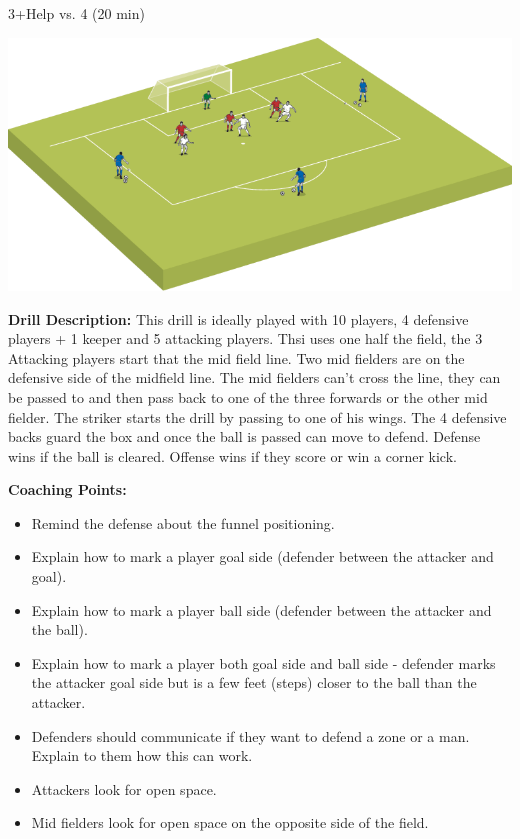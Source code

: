 \begin{evenBlock}{3+Help vs. 4 (20 min)}

\begin{minipage}[t]{\linewidth}
    \centering
    
    \begin{minipage}{.3\linewidth} %
        \includegraphics[width=\textwidth]{../img/Trimmed/SecureTheBox1}
    \end{minipage}
    \hspace{0.05\linewidth}
    \begin{minipage}{.6\linewidth} %
        \textbf{Drill Description:}
        This drill is ideally played with 10 players, 4 defensive players + 1 keeper and 5 attacking players.  Thsi uses one half the field, the 3 Attacking players start that the mid field line.  Two mid fielders are on the defensive side of the midfield line.  The mid fielders can't cross the line, they can be passed to and then pass back to one of the three forwards or the other mid fielder.  The striker starts the drill by passing to one of his wings.  The 4 defensive backs guard the box and once the ball is passed can move to defend.  Defense wins if the ball is cleared.  Offense wins if they score or win a corner kick.
        
        \textbf{Coaching Points:}
        \begin{itemize}
            \setlength{\itemsep}{0pt}
            \setlength{\parskip}{0pt}
            \setlength{\parsep}{0pt}
            \item Remind the defense about the funnel positioning.
            \item Explain how to mark a player goal side (defender between the attacker and goal).
            \item Explain how to mark a player ball side (defender between the attacker and the ball).
            \item Explain how to mark a player both goal side and ball side - defender marks the attacker goal side but is a few feet (steps) closer to the ball than the attacker.
            \item Defenders should communicate if they want to defend a zone or a man.  Explain to them how this can work.
            \item Attackers look for open space.
            \item Mid fielders look for open space on the opposite side of the field.
        \end{itemize}


\end{minipage}
\end{minipage}
\end{evenBlock}
